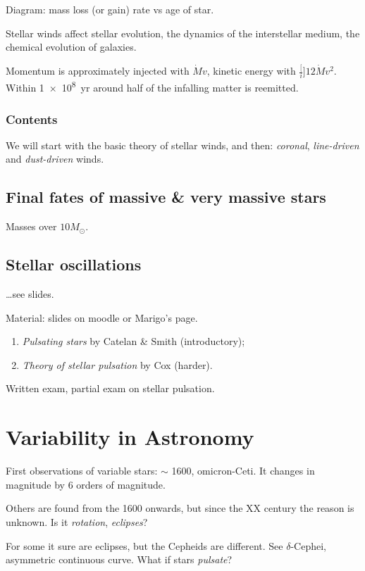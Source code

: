 \documentclass[main.tex]{subfiles}
\begin{document}
Diagram: mass loss (or gain) rate vs age of star.

Stellar winds affect stellar evolution, the dynamics of the interstellar medium, the chemical evolution of galaxies.

Momentum is approximately injected with \(\dot{M} v\), kinetic energy with \(\frac[i]{1}{2} \dot{M} v^2\).
Within \SI{1e8}{yr} around half of the infalling matter is reemitted.

\subsubsection{Contents}

We will start with the basic theory of stellar winds, and then: \emph{coronal}, \emph{line-driven} and \emph{dust-driven} winds.

\subsection{Final fates of massive \& very massive stars}

Masses over \(10 M_{\odot}\).

\subsection{Stellar oscillations}

\dots see slides.

Material: slides on moodle or Marigo's page.

\begin{enumerate}
    \item \emph{Pulsating stars} by Catelan \& Smith (introductory);
    \item \emph{Theory of stellar pulsation} by Cox (harder).
\end{enumerate}

Written exam, partial exam on stellar pulsation.

\section{Variability in Astronomy}

First observations of variable stars: \(\sim\) 1600, omicron-Ceti. It changes in magnitude by 6 orders of magnitude.

Others are found from the 1600 onwards, but since the XX century the reason is unknown. Is it \emph{rotation}, \emph{eclipses}?

For some it sure are eclipses, but the Cepheids are different. See \(\delta\)-Cephei, asymmetric continuous curve.
What if stars \emph{pulsate}?
\end{document}
